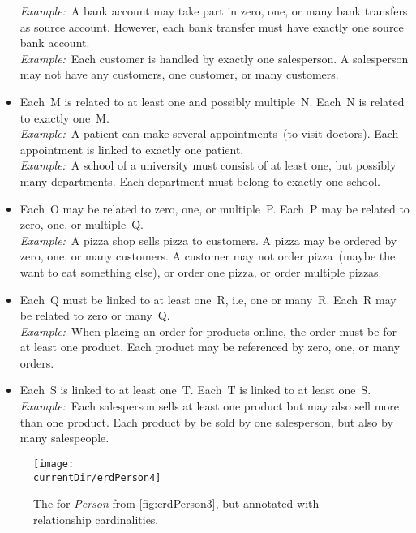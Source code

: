 \begin{itemize}
\emph{Example:}~A bank account may take part in zero, one, or many bank transfers as source account.
However, each bank transfer must have exactly one source bank account.~\cite{MA2006MAC:DMERDED}\\%
\emph{Example:}~Each customer is handled by exactly one salesperson.
A salesperson may not have any customers, one customer, or many customers.~\cite{T2025CDBMS:ERM}%
%
\item {} Each~M is related to at least one and possibly multiple~N. Each~N is related to exactly one~M.~\cite{BS2023G:EDFAHMSCFN}\\%
\emph{Example:}~A patient can make several appointments~(to visit doctors).
Each appointment is linked to exactly one patient.~\cite{BS2023G:EDFAHMSCFN}\\%
\emph{Example:}~A school of a university must consist of at least one, but possibly many departments.
Each department must belong to exactly one school.~\cite{R2024CDS:E}%
%
\item {} Each~O may be related to zero, one, or multiple~P. Each~P may be related to zero, one, or multiple~Q.\\%
\emph{Example:}~A pizza shop sells pizza to customers.
A pizza may be ordered by zero, one, or many customers.
A customer may not order pizza~(maybe the want to eat something else), or order one pizza, or order multiple pizzas.~\cite{FCC2016D:CFNRSAHTRD}%
%
\item {} Each~Q must be linked to at least one~R, i.e, one or many~R. Each~R may be related to zero or many~Q.~\cite{BS2023G:CFNIERD}\\%
\emph{Example:}~When placing an order for products online, the order must be for at least one product.
Each product may be referenced by zero, one, or many orders.~\cite{BS2023G:CFNIERD}%
%
\item {} Each~S is linked to at least one~T. Each~T is linked to at least one~S.~\cite{T2025CDBMS:ERM}\\%
\emph{Example:}~Each salesperson sells at least one product but may also sell more than one product.
Each product by be sold by one salesperson, but also by many salespeople.~\cite{T2025CDBMS:ERM}
%
\end{itemize}%
%
\FloatBarrier%
%
\begin{figure}%
\centering%
\texttt{[image: \\currentDir/erdPerson4]}%
\caption{The  for \emph{Person} from \cref{fig:erdPerson3}, but annotated with relationship cardinalities.}%
\label{fig:erdPerson4}%
\end{figure}%

